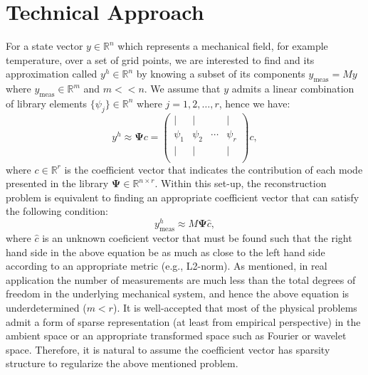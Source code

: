 \documentclass[conference]{IEEEtran}
\begin{document}
\section{Technical Approach}
For a state vector $y \in \mathbb{R}^n$ which represents a mechanical field, for example temperature, over a set of grid points, we are interested to find and its approximation called $y^h \in \mathbb{R}^n$ by knowing a subset of its components $y_{\text{meas}} = M y$ where $y_{\text{meas}} \in \mathbb{R}^m$ and $m<<n$. We assume that $y$ admits a linear combination of library elements $\{ \psi_j \} \in \mathbb{R}^n$ where $j=1,2,\dots,r$, hence we have:
\begin{equation}
y^h \approx \mathbf{\Psi} c = 
\begin{pmatrix}
\mid & \mid & & \mid \\
\psi_1 & \psi_2 & \cdots & \psi_r\\
\mid & \mid & & \mid \\
\end{pmatrix}
c,
\end{equation}
where $c \in \mathbb{R}^r$ is the coefficient vector that indicates the contribution of each mode presented in the library $\mathbf{\Psi} \in \mathbb{R}^{n\times r}$. Within this set-up, the reconstruction problem is equivalent to finding an appropriate coefficient vector that can satisfy the following condition:
\begin{equation}
y_{\text{meas}}^h \approx M\mathbf{\Psi}\hat{c},
\end{equation}
where $\hat{c}$ is an unknown coeficient vector that must be found such that the right hand side in the above equation be as much as close to the left hand side according to an appropriate metric (e.g., L2-norm). As mentioned, in real application the number of measurements are much less than the total degrees of freedom in the underlying mechanical system, and hence the above equation is underdetermined ($m<r$). It is well-accepted that most of the physical problems admit a form of sparse representation (at least from empirical perspective) in the ambient space or an appropriate transformed space such as Fourier or wavelet space. Therefore, it is natural to assume the coefficient vector has sparsity structure to regularize the above mentioned problem.
\end{document}
